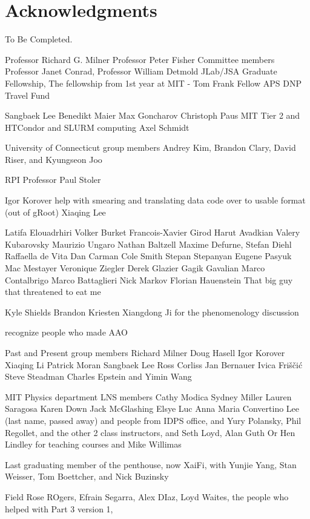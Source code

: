 \section*{Acknowledgments}
To Be Completed. 

\iffalse

Professor Richard G. Milner
Professor Peter Fisher
Committee members Professor Janet Conrad, Professor William Detmold
JLab/JSA Graduate Fellowship, 
The fellowship from 1st year at MIT - Tom Frank Fellow
APS DNP Travel Fund

Sangbaek Lee
Benedikt Maier
Max Goncharov
Christoph Paus
MIT Tier 2 and HTCondor and SLURM computing
Axel Schmidt

University of Connecticut group members Andrey Kim, Brandon Clary, David Riser, and Kyungseon Joo

RPI Professor Paul Stoler


Igor Korover help with smearing and translating data code over to usable format (out of gRoot)
Xiaqing Lee

Latifa Elouadrhiri
Volker Burket
Francois-Xavier Girod
Harut Avadkian
Valery Kubarovsky
Maurizio Ungaro
Nathan Baltzell
Maxime Defurne,
Stefan Diehl
Raffaella de Vita
Dan Carman
Cole Smith
Stepan Stepanyan
Eugene Pasyuk
Mac Mestayer
Veronique Ziegler
Derek Glazier
Gagik Gavalian
Marco Contalbrigo
Marco Battaglieri
Nick Markov
Florian Hauenstein
That big guy that threatened to eat me

Kyle Shields
Brandon Kriesten
Xiangdong Ji
for the phenomenology discussion

recognize people who made AAO 

Past and Present group members
Richard Milner Doug Hasell Igor Korover Xiaqing Li Patrick Moran Sangbaek Lee Ross Corliss Jan Bernauer Ivica Friščić Steve Steadman Charles Epstein and Yimin Wang

MIT Physics department LNS members Cathy Modica Sydney Miller Lauren Saragosa Karen Down Jack McGlashing Elsye Luc Anna Maria Convertino Lee (last name, passed away) 
and people from IDPS office, and Yury Polansky, Phil Regollet, and the other 2 class instructors, and Seth Loyd, Alan Guth Or Hen Lindley for teaching courses and Mike Willimas

Last graduating member of the penthouse, now XaiFi, with Yunjie Yang, Stan Weisser, Tom Boettcher, and Nick Buzinsky

Field Rose ROgers, Efrain Segarra, Alex DIaz, Loyd Waites, the people who helped with Part 3 version 1, 

